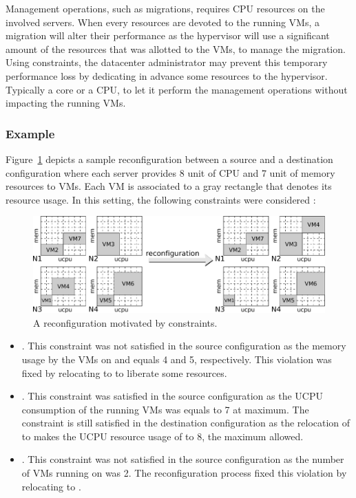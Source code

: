 Management operations, such as migrations, requires CPU resources on the involved servers.
When every resources are devoted to the running VMs, a migration will alter their performance as the hypervisor will use a significant amount of the resources that was allotted to the VMs, to manage the migration.
Using  constraints, the datacenter administrator may prevent this temporary performance loss by dedicating in advance some resources to the hypervisor. Typically a core or a CPU, to let it perform the management operations without impacting the running VMs.

\subsubsection{Example}

Figure~\ref{fig: singleCapacity} depicts a sample reconfiguration between a source and a destination configuration where each server provides 8 unit of CPU and 7 unit of memory resources to VMs. Each VM is associated to a gray rectangle that denotes its resource usage. In this setting, the following  constraints were considered :

\begin{figure}[htb]
\centering
\includegraphics[width=\textwidth]{img/singleCapacity}
\caption{A reconfiguration motivated by  constraints.}\label{fig: singleCapacity}
\end{figure}


\begin{itemize}
\item {}. This constraint was not satisfied in the source configuration
as the memory usage by the VMs on  and  equals 4 and 5, respectively.
This violation was fixed by relocating  to  to liberate some resources.

\item {}. This constraint was satisfied in the source configuration
as the UCPU consumption of the running VMs was equals to 7 at maximum. The constraint is still satisfied
in the destination configuration as the relocation of  to  makes the UCPU resource usage of 
to 8, the maximum allowed.

\item {}. This constraint was not satisfied in the source configuration
as the number of VMs running on  was 2. The reconfiguration process fixed this violation by relocating
 to .
\end{itemize}

